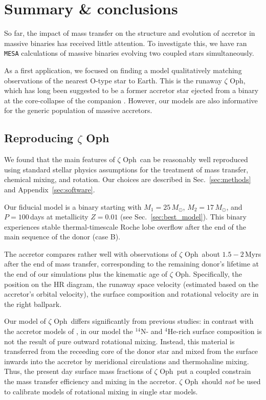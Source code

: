 \documentclass[twocolumn,twocolappendix,trackchanges]{aastex63}
\DeclareRobustCommand{\Secref}[1]{Sec.~\ref{#1}}
\newcommand{\zoph}{$\zeta$ Oph}
\begin{document}
\section{Summary \& conclusions}
\label{sec:conclusions}

So far, the impact of mass transfer on the structure and evolution of accretor in massive
binaries has received little attention.  To investigate this, we have
ran \texttt{MESA} calculations of massive binaries evolving two
coupled stars simultaneously.

As a first application, we focused on finding a model qualitatively
matching observations of the nearest O-type star to Earth. This is the
runaway \zoph, which has long been suggested to be a former accretor
star ejected from a binary at the core-collapse of the
companion \citep[binary SN scenario,][]{blaauw:61}. However, our
models are also informative for the generic population of massive
accretors.

\subsection{Reproducing \zoph}

We found that the main features of \zoph\ can be
reasonably well reproduced using standard stellar physics
assumptions for the treatment of mass transfer, chemical mixing, and
rotation. Our choices are described in \Secref{sec:methods} and
Appendix~\ref{sec:software}.

Our fiducial model is a binary starting
with $M_1=25\,M_\odot$, $M_2=17\,M_\odot$, and $P=100$\,days at
metallicity $Z=0.01$ (see \Secref{sec:best_model}). This binary
experiences stable thermal-timescale Roche lobe overflow after the end
of the main sequence of the donor (case B).

The accretor
compares rather well with observations of \zoph\ about $1.5-2$\,Myrs
after the end of mass transfer, corresponding to the remaining donor's
lifetime at the end of our simulations plus the kinematic age of
\zoph. Specifically, the position on the HR diagram, the runaway space
velocity (estimated based on the accretor's orbital velocity), the
surface composition and rotational velocity are in the right ballpark.

Our model of \zoph\ differs significantly from previous studies: in
contrast with the accretor models of \cite{vanrensbergen:96}, in our
model the $^{14}\mathrm{N}$- and $^4\mathrm{He}$-rich surface
composition is not the result of pure outward rotational mixing.
Instead, this material is transferred from the receeding core of the
donor star and mixed from the surface inwards into the accretor by
meridional circulations and thermohaline mixing.  Thus, the present
day surface mass fractions of \zoph\ put a coupled constrain the mass
transfer efficiency and mixing in the accretor. \zoph\ should
\emph{not} be used to calibrate models of rotational mixing in single
star models.
\end{document}
